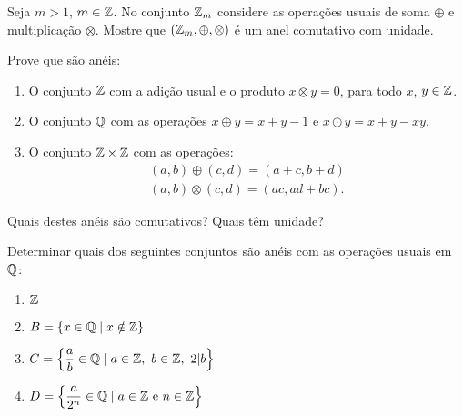 \documentclass[12pt]{exam}
\begin{document}
\vspace{.2cm}

\questao{} Seja $m > 1$, $m \in \mathbb{Z}$. No conjunto $\mathbb{Z}_m$ considere as opera\c{c}\~oes usuais de soma $\oplus$ e multiplica\c{c}\~ao $\otimes$. Mostre que $(\mathbb{Z}_m, \oplus, \otimes)$ \'e um anel comutativo com unidade.

\vspace{.2cm}

\questao{} Prove que s\~ao an\'eis:
\begin{enumerate}[label={\alph*})]
	\item O conjunto $\mathbb{Z}$ com a adi\c{c}\~ao usual e o produto $x \otimes y = 0$, para todo $x$, $y \in \mathbb{Z}$.
	\item O conjunto $\mathbb{Q}$ com as opera\c{c}\~oes $x \oplus y = x + y - 1$ e $x \odot y = x + y - xy$.
	\item O conjunto $\mathbb{Z} \times \mathbb{Z}$ com as opera\c{c}\~oes:
	\begin{align*}
		(a, b) \oplus (c, d) = (a + c, b + d)\\
		(a ,b) \otimes (c, d) = (ac, ad + bc).
	\end{align*}
\end{enumerate}
Quais destes an\'eis s\~ao comutativos? Quais t\^em unidade?

\vspace{.2cm}

\questao{} Determinar quais dos seguintes conjuntos s\~ao an{\'e}is com as opera\c{c}\~oes usuais em $\mathbb{Q}$:
	\begin{multicols}{2}
		\begin{enumerate}[label=({\alph*})]
			\item $\mathbb{Z}$
			\item $B = \{x \in \mathbb{Q} \mid x \notin \mathbb{Z}\}$
			\item $C = \left\{\dfrac{a}{b} \in \mathbb{Q} \mid a \in \mathbb{Z},\ b \in \mathbb{Z},\ 2 |b \right\}$
			\item $D = \left\{\dfrac{a}{2^n} \in \mathbb{Q} \mid a \in \mathbb{Z} \mbox{ e } n \in \mathbb{Z} \right\}$
		\end{enumerate}
	\end{multicols}

\vspace{.2cm}
\end{document}
